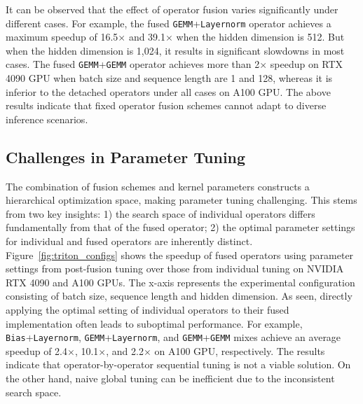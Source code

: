 It can be observed that the effect of operator fusion varies significantly under different cases. For example, the fused \texttt{GEMM}+\texttt{Layernorm} operator achieves a maximum speedup of 16.5$\times$ and 39.1$\times$ when the hidden dimension is 512. But when the hidden dimension is 1,024, it results in significant slowdowns in most cases. The fused \texttt{GEMM}+\texttt{GEMM} operator achieves more than 2$\times$ speedup on RTX 4090 GPU when batch size and sequence length are 1 and 128, whereas it is inferior to the detached operators under all cases on A100 GPU. The above results indicate that fixed operator fusion schemes cannot adapt to diverse inference scenarios.



\subsection{Challenges in Parameter Tuning}
\label{sec:cos}





The combination of fusion schemes and kernel parameters constructs a hierarchical optimization space, making parameter tuning challenging. This stems from two key insights: 1) the search space of individual operators differs fundamentally from that of the fused operator; 2) the optimal parameter settings for individual and fused operators are inherently distinct. Figure~\ref{fig:triton_configs} shows the speedup of fused operators using parameter settings from post-fusion tuning over those from individual tuning on NVIDIA RTX 4090 and A100 GPUs. The x-axis represents the experimental configuration consisting of batch size, sequence length and hidden dimension. As seen, directly applying the optimal setting of individual operators to their fused implementation often leads to suboptimal performance. For example, \texttt{Bias}+\texttt{Layernorm}, \texttt{GEMM}+\texttt{Layernorm}, and \texttt{GEMM}+\texttt{GEMM} mixes achieve an average speedup of 2.4$\times$, 10.1$\times$, and 2.2$\times$ on A100 GPU, respectively. The results indicate that operator-by-operator sequential tuning is not a viable solution. On the other hand, naive global tuning can be inefficient due to the inconsistent search space.

